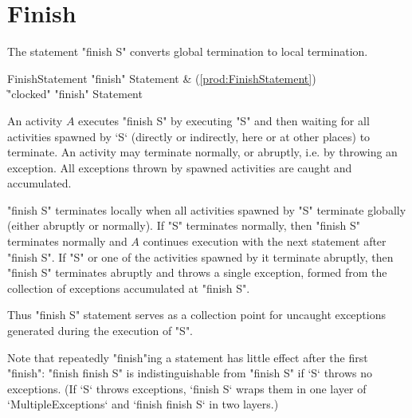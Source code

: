 \section{Finish}\label{finish}
The statement \xcd"finish S" converts global termination to local
termination.

\begin{bbgrammar}
 FinishStatement    \: \xcd"finish" Statement & (\ref{prod:FinishStatement})\\%
    \| \xcd"clocked" \xcd"finish" Statement\\
\end{bbgrammar}

An activity $A$ executes \xcd"finish S" by executing \xcd"S" and
then waiting for all activities spawned by \xcd`S` (directly or
indirectly, here or at other places) to terminate. An activity may
terminate normally, or abruptly, i.e. by throwing an exception.
All exceptions thrown by spawned activities are caught and
accumulated. 

\xcd"finish S" terminates locally when all activities spawned by
\xcd"S" terminate globally (either abruptly or normally). If \xcd"S"
terminates normally, then \xcd"finish S" terminates normally and $A$
continues execution with the next statement after \xcd"finish S".  If
\xcd"S" or one of the activities spawned by it terminate abruptly,
then \xcd"finish S" terminates abruptly and throws a single exception,
 formed from the collection of
exceptions accumulated at \xcd"finish S".

Thus \xcd"finish S" statement serves as a collection point for
uncaught exceptions generated during the execution of \xcd"S".

Note that repeatedly \xcd"finish"ing a statement has little effect after
the first \xcd"finish": \xcd"finish finish S" is indistinguishable
from \xcd"finish S" if \xcd`S` throws no exceptions.  (If \xcd`S` throws
exceptions, \xcd`finish S` wraps them in one layer of 
\xcd`MultipleExceptions` and \xcd`finish finish S` in two layers.)

